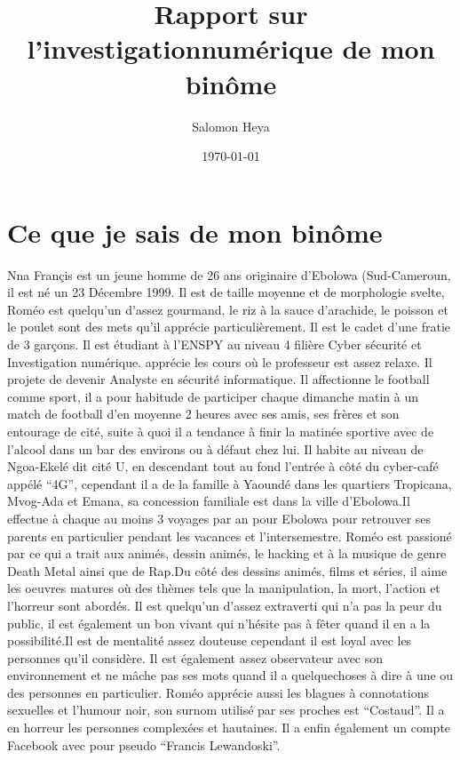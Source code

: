 \documentclass[french]{article}
\author{Salomon Heya}
\date{\today}
\title{Rapport sur l'investigationnumérique de mon binôme}
\begin{document}

\section{Ce que je sais de mon binôme}



Nna Françis est un jeune homme de 26 ans originaire d'Ebolowa (Sud-Cameroun, il est né un 23 Décembre 1999. Il est de taille moyenne et de morphologie svelte, Roméo est quelqu'un d'assez gourmand, le riz à la sauce d'arachide, le poisson et le poulet sont des mets qu'il apprécie particulièrement. \newline Il est le cadet d'une fratie de 3 garçons. Il est étudiant à l'ENSPY au niveau 4 filière Cyber sécurité et Investigation numérique. \newline apprécie les cours où le professeur est assez relaxe. Il projete de devenir Analyste en sécurité informatique. \newline
Il affectionne le football comme sport, il a pour habitude de participer chaque dimanche matin à un match de football d'en moyenne 2 heures avec ses amis, ses frères et son entourage de cité, suite à quoi il a tendance à finir la matinée sportive avec de l'alcool dans un bar des environs ou à défaut chez lui. \newline Il habite au niveau de Ngoa-Ekelé dit cité U, en descendant tout au fond l'entrée à côté du cyber-café appélé ``4G'', cependant il a de la famille à Yaoundé dans les quartiers Tropicana, Mvog-Ada et Emana, sa concession familiale est dans la ville d'Ebolowa.\newline Il effectue à chaque au moins 3 voyages par an pour Ebolowa pour retrouver ses parents en particulier pendant les vacances et l'intersemestre. \newline Roméo est passioné par ce qui a trait aux animés, dessin animés, le hacking et à la musique de genre Death Metal ainsi que de Rap.\newline Du côté des dessins animés, films et séries, il aime les oeuvres matures où des thèmes tels que la manipulation, la mort, l'action et l'horreur sont abordés. \newline Il est quelqu'un d'assez extraverti qui n'a pas la peur du public, il est également un bon vivant qui n'hésite pas à fêter quand il en a la possibilité.\newline Il  est de mentalité assez douteuse cependant il est loyal avec les personnes qu'il considère. \newline Il est également assez observateur avec son environnement et ne mâche pas ses mots quand il a quelquechoses à dire à une ou des personnes en particulier. Roméo apprécie aussi les blagues à connotations sexuelles et l'humour noir, son surnom utilisé par ses proches est ``Costaud''. \newline Il a en horreur les personnes complexées et hautaines. Il a enfin également un compte Facebook avec pour pseudo ``Francis Lewandoski''.
\end{document}
